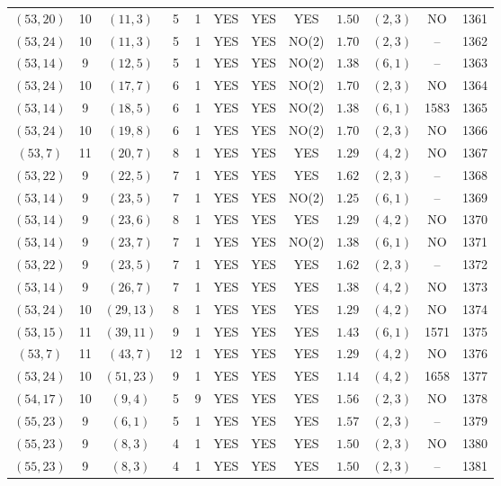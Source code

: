 \begin{longtable}{|c|c|c|c|c|c|c|c|c|c|c|c|}
$(53,20)$ & 10 & $(11,3)$ & 5 & 1 & YES & YES & YES & $1.50$ & $(2,3)$ & NO & 1361\\
$(53,24)$ & 10 & $(11,3)$ & 5 & 1 & YES & YES & NO(2) & $1.70$ & $(2,3)$ & -- & 1362\\
$(53,14)$ & 9 & $(12,5)$ & 5 & 1 & YES & YES & NO(2) & $1.38$ & $(6,1)$ & -- & 1363\\
$(53,24)$ & 10 & $(17,7)$ & 6 & 1 & YES & YES & NO(2) & $1.70$ & $(2,3)$ & NO & 1364\\
$(53,14)$ & 9 & $(18,5)$ & 6 & 1 & YES & YES & NO(2) & $1.38$ & $(6,1)$ & 1583 & 1365\\
$(53,24)$ & 10 & $(19,8)$ & 6 & 1 & YES & YES & NO(2) & $1.70$ & $(2,3)$ & NO & 1366\\
$(53,7)$ & 11 & $(20,7)$ & 8 & 1 & YES & YES & YES & $1.29$ & $(4,2)$ & NO & 1367\\
$(53,22)$ & 9 & $(22,5)$ & 7 & 1 & YES & YES & YES & $1.62$ & $(2,3)$ & -- & 1368\\
$(53,14)$ & 9 & $(23,5)$ & 7 & 1 & YES & YES & NO(2) & $1.25$ & $(6,1)$ & -- & 1369\\
$(53,14)$ & 9 & $(23,6)$ & 8 & 1 & YES & YES & YES & $1.29$ & $(4,2)$ & NO & 1370\\
$(53,14)$ & 9 & $(23,7)$ & 7 & 1 & YES & YES & NO(2) & $1.38$ & $(6,1)$ & NO & 1371\\
$(53,22)$ & 9 & $(23,5)$ & 7 & 1 & YES & YES & YES & $1.62$ & $(2,3)$ & -- & 1372\\
$(53,14)$ & 9 & $(26,7)$ & 7 & 1 & YES & YES & YES & $1.38$ & $(4,2)$ & NO & 1373\\
$(53,24)$ & 10 & $(29,13)$ & 8 & 1 & YES & YES & YES & $1.29$ & $(4,2)$ & NO & 1374\\
$(53,15)$ & 11 & $(39,11)$ & 9 & 1 & YES & YES & YES & $1.43$ & $(6,1)$ & 1571 & 1375\\
$(53,7)$ & 11 & $(43,7)$ & 12 & 1 & YES & YES & YES & $1.29$ & $(4,2)$ & NO & 1376\\
$(53,24)$ & 10 & $(51,23)$ & 9 & 1 & YES & YES & YES & $1.14$ & $(4,2)$ & 1658 & 1377\\
$(54,17)$ & 10 & $(9,4)$ & 5 & 9 & YES & YES & YES & $1.56$ & $(2,3)$ & NO & 1378\\
$(55,23)$ & 9 & $(6,1)$ & 5 & 1 & YES & YES & YES & $1.57$ & $(2,3)$ & -- & 1379\\
$(55,23)$ & 9 & $(8,3)$ & 4 & 1 & YES & YES & YES & $1.50$ & $(2,3)$ & NO & 1380\\
$(55,23)$ & 9 & $(8,3)$ & 4 & 1 & YES & YES & YES & $1.50$ & $(2,3)$ & -- & 1381\\

\end{longtable}
